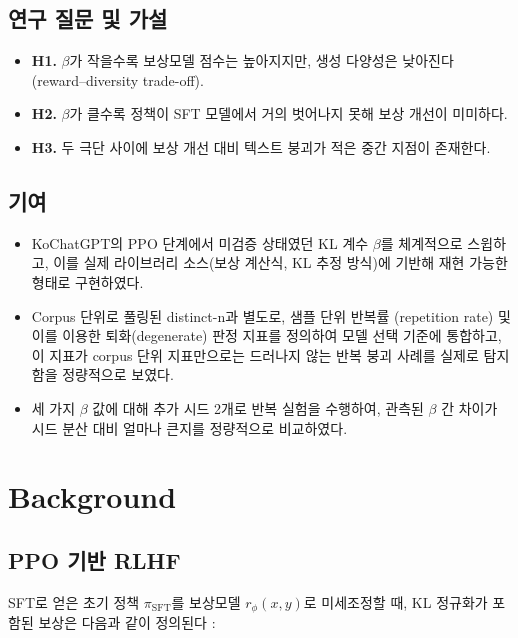 \documentclass[conference]{IEEEtran}
\begin{document}
\subsection{연구 질문 및 가설}
\begin{itemize}
  \item \textbf{H1.} $\beta$가 작을수록 보상모델 점수는 높아지지만, 생성
        다양성은 낮아진다 (reward--diversity trade-off).
  \item \textbf{H2.} $\beta$가 클수록 정책이 SFT 모델에서 거의 벗어나지
        못해 보상 개선이 미미하다.
  \item \textbf{H3.} 두 극단 사이에 보상 개선 대비 텍스트 붕괴가 적은
        중간 지점이 존재한다.
\end{itemize}

\subsection{기여}
\begin{itemize}
  \item KoChatGPT의 PPO 단계에서 미검증 상태였던 KL 계수 $\beta$를
        체계적으로 스윕하고, 이를 실제 라이브러리 소스(보상 계산식, KL
        추정 방식)에 기반해 재현 가능한 형태로 구현하였다.
  \item Corpus 단위로 풀링된 distinct-n과 별도로, 샘플 단위 반복률
        (repetition rate) 및 이를 이용한 퇴화(degenerate) 판정 지표를
        정의하여 모델 선택 기준에 통합하고, 이 지표가 corpus 단위 지표만으로는
        드러나지 않는 반복 붕괴 사례를 실제로 탐지함을 정량적으로 보였다.
  \item 세 가지 $\beta$ 값에 대해 추가 시드 2개로 반복 실험을 수행하여,
        관측된 $\beta$ 간 차이가 시드 분산 대비 얼마나 큰지를 정량적으로
        비교하였다.
\end{itemize}

\section{Background}

\subsection{PPO 기반 RLHF}

SFT로 얻은 초기 정책 $\pi_{\text{SFT}}$를 보상모델 $r_\phi(x,y)$로 미세조정할
때, KL 정규화가 포함된 보상은 다음과 같이 정의된다
\cite{ziegler2019finetuning, ouyang2022instructgpt}:
\end{document}
